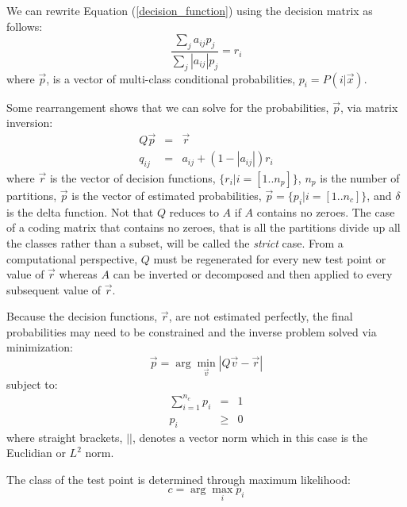 \documentclass{article}
\begin{document}
We can rewrite Equation (\ref{decision_function}) using the decision
matrix as follows:
\begin{equation}
	\frac{\sum_j a_{ij} p_j}{\sum_j |a_{ij}| p_j} = r_i
\end{equation}
where $\vec p$, is a vector of multi-class conditional probabilities, $p_i=P(i|\vec x)$.

Some rearrangement shows that
we can solve for the probabilities, $\vec p$, via matrix inversion:
\begin{eqnarray}
	Q \vec p & = & \vec r \label{basic_system}\\
	q_{ij} & = & a_{ij} + (1-|a_{ij}|) r_i 
	\label{matrix_inverse2}
\end{eqnarray}
where $\vec r$ is the vector of decision functions, $\lbrace r_i| i=[1..n_p]\rbrace$, $n_p$ is the number of partitions,
$\vec p$ is the vector of estimated probabilities, $\vec p =\lbrace p_i | i=[1..n_c]\rbrace$, and $\delta$ is the delta function.
Not that $Q$ reduces to $A$ if $A$ contains no zeroes.
The case of a coding matrix that contains no zeroes, that is all the partitions divide up all the
classes rather than a subset, will be called the {\it strict} case.
From a computational perspective, 
$Q$ must be regenerated for every new test point or value of $\vec r$ 
whereas $A$ can be inverted or decomposed and then
applied to every subsequent value of $\vec r$.

Because the decision functions, $\vec r$, are not estimated perfectly,
the final probabilities may need to be constrained and the inverse
problem solved via minimization:
\begin{equation}
	\vec p = \arg \min_{\vec v} | Q \vec v - \vec r | \label{minimization_problem}
\end{equation}
subject to:
\begin{eqnarray}
	\sum_{i=1}^{n_c} p_i & = & 1 \label{first_constraint}\\
	p_i & \ge & 0 \label{constraints}
\end{eqnarray}
where straight brackets, $||$, denotes a vector norm which  
in this case is the Euclidian or $L^2$ norm.

The class of the test point is determined through maximum likelihood:
\begin{equation}
	c = \arg \max_i p_i
\end{equation}
\end{document}
